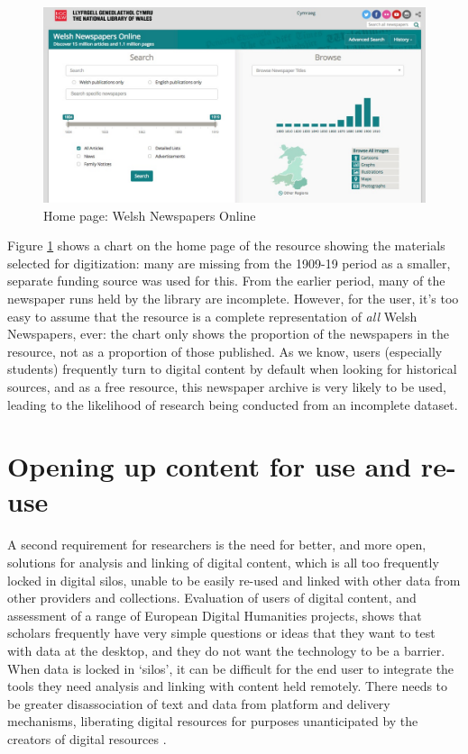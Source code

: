 \documentclass[amsthm,ebook]{saparticle}
\begin{document}
\begin{figure}[!htbp]
\centering
 \includegraphics[scale=.28]{img/fig1.jpg}
\caption{Home page: Welsh Newspapers Online}
\label{fig:1}
\end{figure}

Figure \ref{fig:1} shows a chart on the home page of the resource showing the materials selected for digitization: many are missing from the 1909-19 period as a smaller, separate funding source was used for this. From the earlier period, many of the newspaper runs held by the library are incomplete. However, for the user, it’s too easy to assume that the resource is a complete representation of \emph{all} Welsh Newspapers, ever: the chart only shows the proportion of the newspapers in the resource, not as a proportion of those published. As we know, users (especially students) frequently turn to digital content by default when looking for historical sources, and as a free resource, this newspaper archive is very likely to be used, leading to the likelihood of research being conducted from an incomplete dataset. 

\section{Opening up content for use and re-use}

A second requirement for researchers is the need for better, and more open, solutions for analysis and linking of digital content, which is all too frequently locked in digital silos, unable to be easily re-used and linked with other data from other providers and collections. Evaluation of users of digital content, and assessment of a range of European Digital Humanities projects, shows that scholars frequently have very simple questions or ideas that they want to test with data at the desktop, and they do not want the technology to be a barrier. When data is locked in ‘silos’, it can be difficult for the end user to integrate the tools they need analysis and linking with content held remotely. There needs to be greater disassociation of text and data from platform and delivery mechanisms, liberating digital resources for purposes unanticipated by the creators of digital resources \citep{Robinson:2014aa}. 
\end{document}
